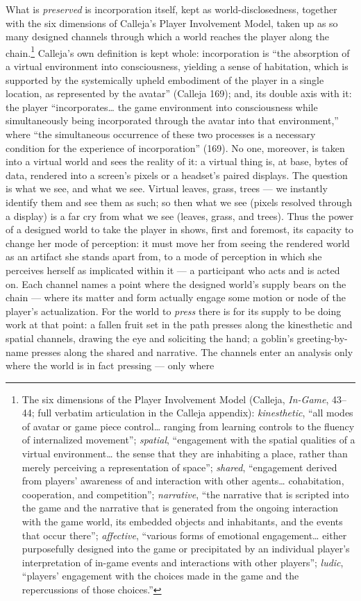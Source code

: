 \documentclass{article}
\begin{document}
What is \textit{preserved} is incorporation itself, kept as world-disclosedness, together with the six dimensions of Calleja's Player Involvement Model, taken up as so many designed channels through which a world reaches the player along the chain.\footnote{The six dimensions of the Player Involvement Model (Calleja, \textit{In-Game}, 43–44; full verbatim articulation in the Calleja appendix): \textit{kinesthetic}, ``all modes of avatar or game piece control… ranging from learning controls to the fluency of internalized movement''; \textit{spatial}, ``engagement with the spatial qualities of a virtual environment… the sense that they are inhabiting a place, rather than merely perceiving a representation of space''; \textit{shared}, ``engagement derived from players' awareness of and interaction with other agents… cohabitation, cooperation, and competition''; \textit{narrative}, ``the narrative that is scripted into the game and the narrative that is generated from the ongoing interaction with the game world, its embedded objects and inhabitants, and the events that occur there''; \textit{affective}, ``various forms of emotional engagement… either purposefully designed into the game or precipitated by an individual player's interpretation of in-game events and interactions with other players''; \textit{ludic}, ``players' engagement with the choices made in the game and the repercussions of those choices.''} Calleja's own definition is kept whole: incorporation is ``the absorption of a virtual environment into consciousness, yielding a sense of habitation, which is supported by the systemically upheld embodiment of the player in a single location, as represented by the avatar'' (Calleja 169); and, its double axis with it: the player ``incorporates… the game environment into consciousness while simultaneously being incorporated through the avatar into that environment,'' where ``the simultaneous occurrence of these two processes is a necessary condition for the experience of incorporation'' (169). No one, moreover, is taken into a virtual world and sees the reality of it: a virtual thing is, at base, bytes of data, rendered into a screen's pixels or a headset's paired displays. The question is what we see, and what we see. Virtual leaves, grass, trees — we instantly identify them and see them as such; so then what we see (pixels resolved through a display) is a far cry from what we see (leaves, grass, and trees). Thus the power of a designed world to take the player in shows, first and foremost, its capacity to change her mode of perception: it must move her from seeing the rendered world as an artifact she stands apart from, to a mode of perception in which she perceives herself as implicated within it — a participant who acts and is acted on. Each channel names a point where the designed world's supply bears on the chain — where its matter and form actually engage some motion or node of the player's actualization. For the world to \textit{press} there is for its supply to be doing work at that point: a fallen fruit set in the path presses along the kinesthetic and spatial channels, drawing the eye and soliciting the hand; a goblin's greeting-by-name presses along the shared and narrative. The channels enter an analysis only where the world is in fact pressing — only where 
\end{document}
